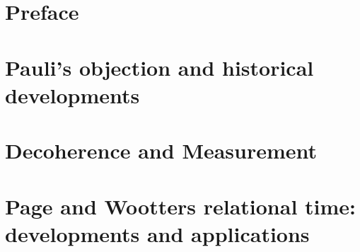 




\frontmatter

\maketitle

\cleardoublepage
{}
\tableofcontents

\listoffigures

\listoftables

\chapter*{Preface}


%   

\mainmatter

\chapter{Pauli's objection and historical developments}



\chapter{Decoherence and Measurement}\label{ch:decohere}









\chapter{Page and Wootters relational time: developments and applications}
  \label{ch:pw}




